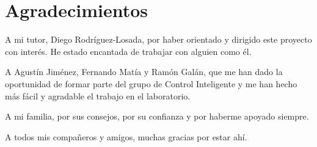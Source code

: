 
\chapter{Agradecimientos}

A mi tutor, Diego Rodríguez-Losada, por haber orientado y dirigido este proyecto con interés. He estado encantada de trabajar con alguien como él.

\vspace{5mm}
\noindent
A Agustín Jiménez, Fernando Matía y Ramón Galán, que me han dado la oportunidad de formar parte del grupo de Control Inteligente y me han hecho más fácil y agradable el trabajo en el laboratorio.

\vspace{5mm}
\noindent
A mi familia, por sus consejos, por su confianza y por haberme apoyado siempre.

\vspace{5mm}
\noindent
A todos mis compañeros y amigos, muchas gracias por estar ahí. 